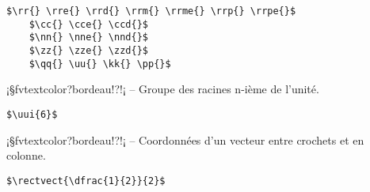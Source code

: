 \documentclass[11pt,a4paper,rgb]{report}
\begin{document}
\colorbox{blue!15}{}
\hfill
\begin{minipage}{.7\textwidth}
	\begin{lstlisting}[linewidth=\textwidth, language={[LaTeX]TeX}]
	$\rr{} \rre{} \rrd{} \rrm{} \rrme{} \rrp{} \rrpe{}$
	$\cc{} \cce{} \ccd{}$
	$\nn{} \nne{} \nnd{}$
	$\zz{} \zze{} \zzd{}$
	$\qq{} \uu{} \kk{} \pp{}$
	\end{lstlisting}
\end{minipage}

\setlength{\leftskip}{0pt}
\setlength{\textwidth}{18cm}%


\vspace*{.75cm}

\inCodeStub¡§fvtextcolor?bordeau!?!¡ -- Groupe des racines n-ième de l'unité.

\setlength{\leftskip}{.75cm}%
\setlength{\textwidth}{17.25cm}%

\colorbox{blue!15}{}
\hfill
\begin{minipage}{.65\textwidth}
	\begin{lstlisting}[linewidth=\textwidth, language={[LaTeX]TeX}]
	$\uui{6}$
	\end{lstlisting}
\end{minipage}

\setlength{\leftskip}{0pt}
\setlength{\textwidth}{18cm}%


\vspace*{.75cm}

\inCodeStub¡§fvtextcolor?bordeau!?!¡ -- Coordonnées d'un vecteur entre crochets et en colonne.

\setlength{\leftskip}{.75cm}%
\setlength{\textwidth}{17.25cm}%

\colorbox{blue!15}{}
\hfill
\begin{minipage}{.65\textwidth}
	\begin{lstlisting}[linewidth=\textwidth, language={[LaTeX]TeX}]
	$\rectvect{\dfrac{1}{2}}{2}$
	\end{lstlisting}
\end{minipage}
\end{document}
